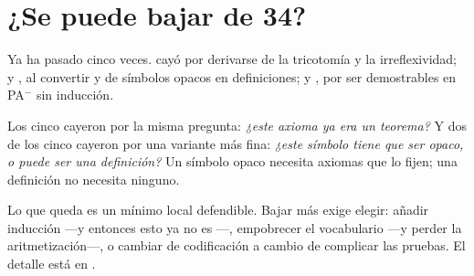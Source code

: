 \section{¿Se puede bajar de 34?}

Ya ha pasado cinco veces.  cayó por derivarse de la tricotomía y la
irreflexividad;  y , al convertir
 y  de símbolos opacos en definiciones;
 y , por ser demostrables en PA\(^-\) sin
inducción.

\begin{leccion}
Los cinco cayeron por la misma pregunta: \emph{¿este axioma ya era un teorema?} Y dos de los cinco
cayeron por una variante más fina: \emph{¿este símbolo tiene que ser opaco, o puede ser una
definición?} Un símbolo opaco necesita axiomas que lo fijen; una definición no necesita ninguno.
\end{leccion}

Lo que queda es un mínimo local defendible. Bajar más exige elegir: añadir inducción —y entonces
esto ya no es —, empobrecer el vocabulario —y perder la aritmetización—, o cambiar de
codificación a cambio de complicar las pruebas. El detalle está en .
